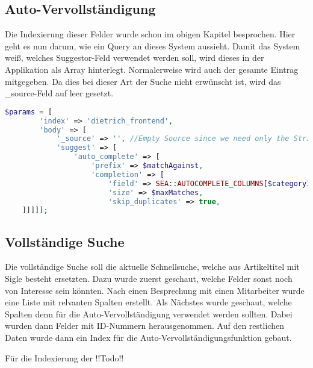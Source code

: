 \subsection{Auto-Vervollständigung}

Die Indexierung dieser Felder wurde schon im obigen Kapitel besprochen. Hier geht es nun darum, wie ein Query an dieses System aussieht. Damit das System weiß, welches Suggestor-Feld verwendet werden soll, wird dieses in der Applikation als Array hinterlegt. Normalerweise wird auch der gesamte Eintrag mitgegeben. Da dies bei dieser Art der Suche nicht erwünscht ist, wird das \_source-Feld auf leer gesetzt.


\begin{lstlisting}[language=PHP, frame=single, label={lst:autocompleParams}] 
    $params = [
        'index' => 'dietrich_frontend',
        'body' => [
            '_source' => '', //Empty Source since we need only the String
            'suggest' => [
                'auto_complete' => [
                    'prefix' => $matchAgainst,
                    'completion' => [
                        'field' => SEA::AUTOCOMPLETE_COLUMNS[$categoryIndex],
                        'size' => $maxMatches,
                        'skip_duplicates' => true,
    ]]]]];
\end{lstlisting}

\subsection{Vollständige Suche}

Die vollständige Suche soll die aktuelle Schnellsuche, welche aus Artikeltitel mit Sigle besteht ersetzten. Dazu wurde zuerst geschaut, welche Felder sonst noch von Interesse sein könnten. Nach einen Besprechung mit einen Mitarbeiter wurde eine Liste mit relvanten Spalten erstellt. Als Nächstes wurde geschaut, welche Spalten denn für die Auto-Vervollständigung verwendet werden sollten. Dabei wurden dann Felder mit ID-Nummern herausgenommen. Auf den restlichen Daten wurde dann ein Index für die Auto-Vervollständigungsfunktion gebaut. 

Für die Indexierung der !!Todo!!